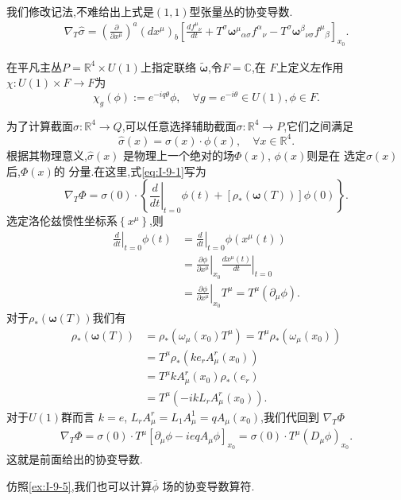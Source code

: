 \documentclass[../main.tex]{subfiles}
\begin{document}
    我们修改记法,不难给出上式是$(1,1)$型张量丛的协变导数.
    \begin{align*}
      \nabla _T \hat{\sigma} = (\frac{\partial  }{\partial x^\mu} )^a(dx^\mu)_b\left[ \frac{ d f^{\mu}{}_{\nu}}{d t} + T^\sigma\bm{\omega}^{\mu}{}_{\alpha\sigma}f^{\alpha}{}_{\nu} - T^\sigma \bm{\omega}^{\beta}{}_{\nu\sigma}f^{\mu}{}_{\beta}   \right]_{x_0} 
    .\end{align*}
    \begin{example}
      \label{ex:I-9-5}
      在平凡主丛$P = \mathbb{R}^4 \times U(1)$上指定联络 $\bm{\tilde{\omega}} $,令$F = \mathbb{C}$,在 $F$上定义左作用 $\chi : U(1) \times F \to F$为\[
        \chi_g(\phi) := e^{-iq\theta} \phi, \quad \forall  g = e^{-i\theta} \in U(1),\phi \in F
      .\] 
    \end{example}
    为了计算截面$\hat{\sigma}: \mathbb{R}^4 \to Q$,可以任意选择辅助截面$\sigma : \mathbb{R}^4 \to P$,它们之间满足\[
      \hat{\sigma}(x) = \sigma(x) \cdot \phi(x), \quad \forall x \in  \mathbb{R}^4
    .\]根据其物理意义,$\hat{\sigma}(x)$ 是物理上一个绝对的场$\Phi(x)$, $\phi(x)$则是在 选定$\sigma(x)$后,$\Phi(x)$的 分量.在这里,式\ref{eq:I-9-1}写为\[
    \nabla_T \Phi = \sigma(0) \cdot \left\{ \left.\frac{d}{dt}\right|_{t = 0} \phi(t) + [\rho_* (\bm{\omega}(T) )]\phi(0) \right\} 
    .\] 
    选定洛伦兹惯性坐标系$\left\{ x^\mu \right\} $,则
    \begin{align*}
      \left.\frac{d}{dt}\right|_{t = 0} \phi(t) & = \left.\frac{d}{dt}\right|_{t = 0}\phi(x^\mu(t)) \\  
                                                & = \left.\frac{\partial \phi}{\partial x^\mu}\right|_{x_0} \left.\frac{d x^\mu(t)}{dt}\right|_{t = 0} \\
                                                & = \left.\frac{\partial \phi}{\partial x^\mu}\right|_{x_0} T^\mu = T^\mu (\partial_\mu \phi)
    .\end{align*}
    对于$\rho_* (\bm{\omega}(T))$我们有
    \begin{align*}
      \rho_* (\bm{\omega}(T)) &= \rho_* (\omega_\mu(x_0)T^\mu) = T^\mu \rho_*(\omega_\mu(x_0)) \\
                              & = T^\mu \rho_*(k e_r A^r_\mu(x_0))\\
                              & = T^\mu k A^r_\mu(x_0 ) \rho_*(e_r)\\
                              & = T^\mu(-ik L_r A^r_\mu(x_0))
    .\end{align*}
    对于$U(1)$群而言 $k = e$, $L_r A^r_\mu = L_1A^1_\mu = qA_\mu(x_0)$,我们代回到 $\nabla_T \Phi$
    \begin{align*}
      \nabla_T \Phi = \sigma(0) \cdot T^\mu[\partial_\mu \phi - ieqA_\mu \phi]_{x_0} = \sigma(0) \cdot T^\mu(D_\mu \phi)_{x_0}
    .\end{align*}
    这就是前面给出的协变导数.
    \begin{example}
      \label{ex:I-9-6}
      仿照\ref{ex:I-9-5},我们也可以计算$\overline{\phi}$ 场的协变导数算符.
    \end{example}
\end{document}
